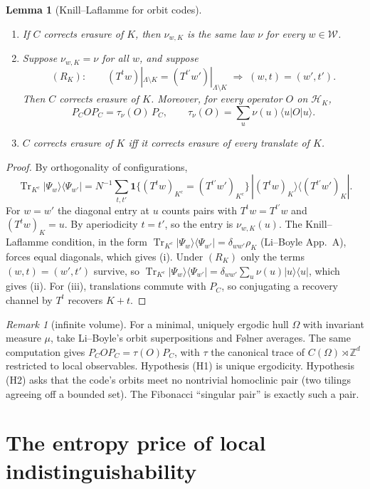 \documentclass[11pt]{article}
\newtheorem{lemma}[theorem]{Lemma}
\theoremstyle{definition}
\theoremstyle{remark}
\newtheorem{remark}[theorem]{Remark}
\newcommand{\Z}{\mathbb Z}
\newcommand{\Tr}{\operatorname{Tr}}
\begin{document}
\begin{lemma}[Knill--Laflamme for orbit codes]\label{lem:kl}
\begin{enumerate}
\item[(i)] If $C$ corrects erasure of $K$, then $\nu_{w,K}$ is the same law $\nu$ for every $w\in\mathcal W$.
\item[(ii)] Suppose $\nu_{w,K}=\nu$ for all $w$, and suppose
\[(R_K):\qquad (T^tw)|_{\Lambda\setminus K}=(T^{t'}w')|_{\Lambda\setminus K}\;\Rightarrow\;(w,t)=(w',t').\]
Then $C$ corrects erasure of $K$. Moreover, for every operator $O$ on $\mathcal H_K$,
\[P_COP_C=\tau_\nu(O)\,P_C,\qquad\tau_\nu(O)=\sum_u\nu(u)\langle u|O|u\rangle .\]
\item[(iii)] $C$ corrects erasure of $K$ iff it corrects erasure of every translate of $K$.
\end{enumerate}
\end{lemma}

\begin{proof}
By orthogonality of configurations,
\[\Tr_{K^c}|\Psi_w\rangle\langle\Psi_{w'}|=N^{-1}\sum_{t,t'}\mathbf 1\{(T^tw)_{K^c}=(T^{t'}w')_{K^c}\}\,|(T^tw)_K\rangle\langle(T^{t'}w')_K|.\]
For $w=w'$ the diagonal entry at $u$ counts pairs with $T^tw=T^{t'}w$ and $(T^tw)_K=u$. By aperiodicity $t=t'$, so the entry is $\nu_{w,K}(u)$. The Knill--Laflamme condition, in the form $\Tr_{K^c}|\Psi_w\rangle\langle\Psi_{w'}|=\delta_{ww'}\rho_K$ (Li--Boyle App.~A), forces equal diagonals, which gives (i). Under $(R_K)$ only the terms $(w,t)=(w',t')$ survive, so $\Tr_{K^c}|\Psi_w\rangle\langle\Psi_{w'}|=\delta_{ww'}\sum_u\nu(u)|u\rangle\langle u|$, which gives (ii). For (iii), translations commute with $P_C$, so conjugating a recovery channel by $T^t$ recovers $K+t$.
\end{proof}

\begin{remark}[infinite volume]
For a minimal, uniquely ergodic hull $\Omega$ with invariant measure $\mu$, take Li--Boyle's orbit superpositions and Følner averages. The same computation gives $P_COP_C=\tau(O)P_C$, with $\tau$ the canonical trace of $C(\Omega)\rtimes\Z^d$ restricted to local observables. Hypothesis (H1) is unique ergodicity. Hypothesis (H2) asks that the code's orbits meet no nontrivial homoclinic pair (two tilings agreeing off a bounded set). The Fibonacci ``singular pair'' is exactly such a pair.
\end{remark}

\section{The entropy price of local indistinguishability}
\end{document}
